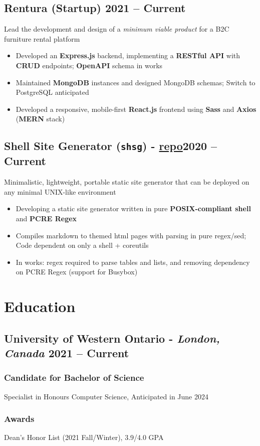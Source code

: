\documentclass[9pt]{article}
\begin{document}
\subsection{Rentura \textnormal{(Startup)} \hfill \normalsize\textnormal{2021 -- Current}}
Lead the development and design of a \textit{minimum viable product} for a B2C furniture rental platform
\vspace{-0.5em}
\begin{itemize}
  \item Developed an \textbf{Express.js} backend, implementing a \textbf{RESTful API} with \textbf{CRUD} endpoints; \textbf{OpenAPI} schema in works
  \item Maintained \textbf{MongoDB} instances and designed MongoDB schemas; Switch to PostgreSQL anticipated
  \item Developed a responsive, mobile-first \textbf{React.js} frontend using \textbf{Sass} and \textbf{Axios} (\textbf{MERN} stack)
\end{itemize}

\subsection{Shell Site Generator (\texttt{shsg}) \normalsize\textnormal{- \href{https://github.com/ianayl/shsg}{repo}}\hfill \normalsize\textnormal{2020 -- Current}}
    Minimalistic, lightweight, portable static site generator that can be deployed on any minimal UNIX-like environment
\vspace{-0.5em}
\begin{itemize}
  \item Developing a static site generator written in pure \textbf{POSIX-compliant shell} and \textbf{PCRE Regex}
    \item Compiles markdown to themed html pages with parsing in pure regex/sed; Code dependent on only a shell + coreutils 
    \item In works: regex required to parse tables and lists, and removing dependency on PCRE Regex (support for Busybox)
\end{itemize}

\section{Education}
\subsection{University of Western Ontario - \normalsize\textit{London, Canada} \hfill \normalsize\textnormal{2021 -- Current}}
\subsubsection{Candidate for Bachelor of Science} Specialist in Honours Computer Science, Anticipated in June 2024

\subsubsection{Awards} Dean's Honor List (2021 Fall/Winter), 3.9/4.0 GPA %
\end{document}
